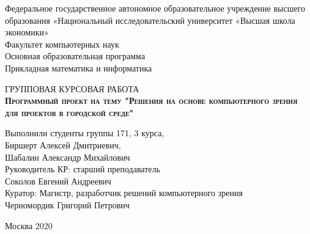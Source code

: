 \begin{titlepage}
    \newpage

    {
    \begin{center}
        Федеральное государственное автономное образовательное учреждение высшего образования «Национальный исследовательский университет «Высшая школа экономики»
        \\
        \bigskip
        Факультет компьютерных наук \\
        Основная образовательная программа \\
        Прикладная математика и информатика \\
    \end{center}
    }

    \vspace{8em}

    \begin{center}
    {\Large ГРУППОВАЯ КУРСОВАЯ РАБОТА}
        \\
        \textsc{\textbf{
        Программный проект на тему
        \linebreak
        "Решения на основе компьютерного зрения для проектов в городской среде"}}
    \end{center}

    \vspace{2em}

    {
    \hfill\parbox{16cm}{
    \hspace*{5cm}\hspace*{-5cm}Выполнили студенты группы 171, 3 курса,\\
    Биршерт Алексей Дмитриевич,\\
    Шабалин Александр Михайлович\\

    \hspace*{5cm}\hspace*{-5cm}Руководитель КР: старший преподаватель\\ Соколов Евгений Андреевич
    \\


    \hspace*{5cm}\hspace*{-5cm}Куратор: Магистр, разработчик решений компьютерного зрения \\
    Черномордик Григорий Петрович
    \\
    }
    }

    \vspace{\fill}

    \begin{center}
        Москва 2020
    \end{center}

\end{titlepage}